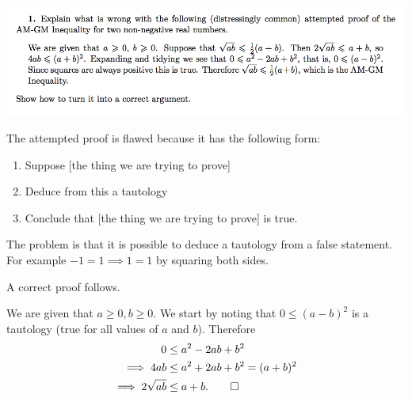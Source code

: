 \documentclass[12pt]{article}
\begin{document}
\subsection*{}
\includegraphics[width=450pt]{img/iulm-2-1.png}
\begin{mdframed}
  The attempted proof is flawed because it has the following form:
  \begin{enumerate}
  \item Suppose [the thing we are trying to prove]
  \item Deduce from this a tautology
  \item Conclude that [the thing we are trying to prove] is true.
  \end{enumerate}
  The problem is that it is possible to deduce a tautology from a false
  statement. For example $-1 = 1 \implies 1 = 1$ by squaring both sides.

  A correct proof follows.

  We are given that $a \geq 0, b \geq 0$. We start by noting that
  $0 \leq (a - b)^2$ is a tautology (true for all values of $a$ and
  $b$). Therefore
  \begin{align*}
              0 &\leq a^2 -2ab + b^2\\
    \implies  4ab &\leq a^2 + 2ab + b^2 = (a + b)^2\\
    \implies  2\sqrt{ab} &\leq a+b. \qed
  \end{align*}
\end{mdframed}
\end{document}
